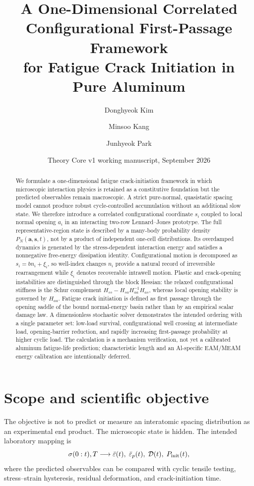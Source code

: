 \documentclass[11pt]{article}
\title{A One-Dimensional Correlated Configurational First-Passage Framework\\
for Fatigue Crack Initiation in Pure Aluminum}
\author{Donghyeok Kim \and Minsoo Kang \and Junhyeok Park}
\date{Theory Core v1 working manuscript, September 2026}
\begin{document}
\maketitle

\begin{abstract}
We formulate a one-dimensional fatigue crack-initiation framework in which microscopic interaction physics is retained as a constitutive foundation but the predicted observables remain macroscopic. A strict pure-normal, quasistatic spacing model cannot produce robust cycle-controlled accumulation without an additional slow state. We therefore introduce a correlated configurational coordinate $s_i$ coupled to local normal opening $a_i$ in an interacting two-row Lennard--Jones prototype. The full representative-region state is described by a many-body probability density $P_N(\bm a,\bm s,t)$, not by a product of independent one-cell distributions. Its overdamped dynamics is generated by the stress-dependent interaction energy and satisfies a nonnegative free-energy dissipation identity. Configurational motion is decomposed as $s_i=b n_i+\xi_i$, so well-index changes $n_i$ provide a natural record of irreversible rearrangement while $\xi_i$ denotes recoverable intrawell motion. Plastic and crack-opening instabilities are distinguished through the block Hessian: the relaxed configurational stiffness is the Schur complement $H_{ss}-H_{sa}H_{aa}^{-1}H_{as}$, whereas local opening stability is governed by $H_{aa}$. Fatigue crack initiation is defined as first passage through the opening saddle of the bound normal-energy basin rather than by an empirical scalar damage law. A dimensionless stochastic solver demonstrates the intended ordering with a single parameter set: low-load survival, configurational well crossing at intermediate load, opening-barrier reduction, and rapidly increasing first-passage probability at higher cyclic load. The calculation is a mechanism verification, not yet a calibrated aluminum fatigue-life prediction; characteristic length and an Al-specific EAM/MEAM energy calibration are intentionally deferred.
\end{abstract}

\section{Scope and scientific objective}
The objective is not to predict or measure an interatomic spacing distribution as an experimental end product. The microscopic state is hidden. The intended laboratory mapping is
\begin{equation}
 \sigma(0:t),T
 \longrightarrow
 \bar\varepsilon(t),\;
 \bar\varepsilon_p(t),\;
 \mathcal{D}(t),\;
 P_{\rm init}(t),
\end{equation}
where the predicted observables can be compared with cyclic tensile testing, stress--strain hysteresis, residual deformation, and crack-initiation time.
\end{document}
